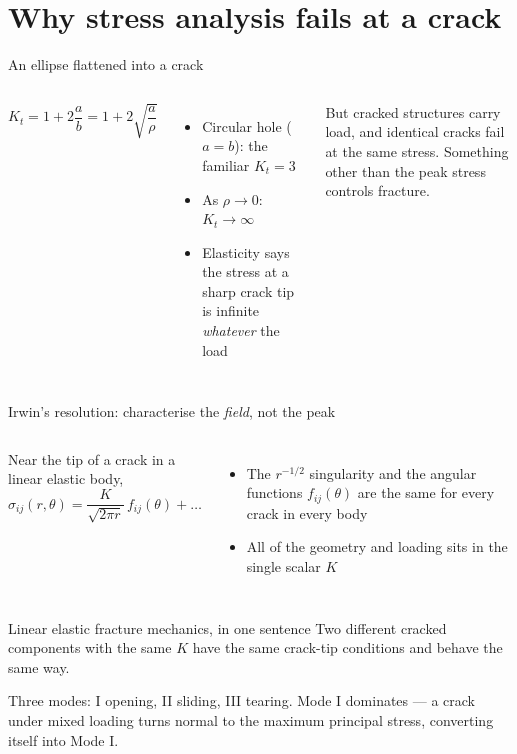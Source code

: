 \documentclass[aspectratio=169,10pt]{beamer}
\begin{document}
\section{Why stress analysis fails at a crack}

\begin{frame}{An ellipse flattened into a crack}
\begin{columns}[T]
\[
K_t=1+2\frac{a}{b}=1+2\sqrt{\frac{a}{\rho}}
\]
\begin{itemize}\footnotesize
  \item Circular hole ($a=b$): the familiar $K_t=3$
  \item As $\rho\to0$: \alert{$K_t\to\infty$}
  \item Elasticity says the stress at a sharp crack tip is infinite \emph{whatever} the load
\end{itemize}
\vspace{2pt}
But cracked structures carry load, and identical cracks fail at the same stress. \alert{Something other than the peak stress controls fracture.}
\centering

\end{columns}
\end{frame}

\begin{frame}{Irwin's resolution: characterise the \emph{field}, not the peak}
\begin{columns}[T]
Near the tip of a crack in a linear elastic body,
\[
\sigma_{ij}(r,\theta)=\frac{K}{\sqrt{2\pi r}}\,f_{ij}(\theta)+\dots
\]
\begin{itemize}\footnotesize
  \item The $r^{-1/2}$ singularity and the angular functions $f_{ij}(\theta)$ are \alert{the same for every crack in every body}
  \item All of the geometry and loading sits in the single scalar $K$
\end{itemize}
\centering

\end{columns}
\vspace{2pt}
\begin{block}{Linear elastic fracture mechanics, in one sentence}
Two different cracked components with the same $K$ have the same crack-tip conditions and behave the same way.
\end{block}
\scriptsize Three modes: I opening, II sliding, III tearing. Mode I dominates --- a crack under mixed loading turns normal to the maximum principal stress, converting itself into Mode I.
\end{frame}
\end{document}
